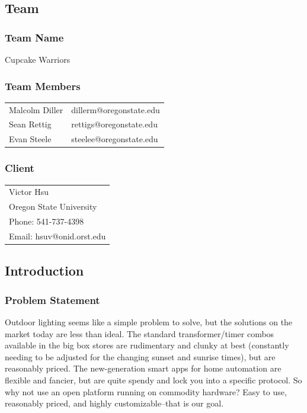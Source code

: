 \subsection{Team}

\subsubsection{Team Name}

Cupcake Warriors

\subsubsection{Team Members} \hfill

\begin{tabular}{ l l }
    Malcolm Diller & dillerm@oregonstate.edu\\
    Sean Rettig & rettigs@oregonstate.edu\\
    Evan Steele & steelee@oregonstate.edu\\
\end{tabular}
\hfill\break

\subsubsection{Client} \hfill

\begin{tabular}{ l }
    Victor Hsu\\
    Oregon State University\\
    Phone: 541-737-4398\\
    Email: hsuv@onid.orst.edu
\end{tabular}
\hfill\break

\subsection{Introduction}

\subsubsection{Problem Statement}

Outdoor lighting seems like a simple problem to solve, but the solutions on the
market today are less than ideal.  The standard transformer/timer combos
available in the big box stores are rudimentary and clunky at best (constantly
needing to be adjusted for the changing sunset and sunrise times), but are
reasonably priced. The new-generation smart apps for home automation are
flexible and fancier, but are quite spendy and lock you into a specific
protocol.  So why not use an open platform running on commodity hardware?  Easy
to use, reasonably priced, and highly customizable--that is our goal.


